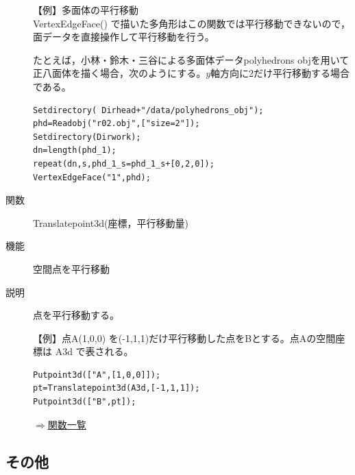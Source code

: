 \documentclass[papersize,a4paper,12pt,uplatex]{jsarticle}
\begin{document}
\begin{description}
\vspace{\baselineskip}
【例】多面体の平行移動\\
VertexEdgeFace() で描いた多角形はこの関数では平行移動できないので，面データを直接操作して平行移動を行う。

たとえば，小林・鈴木・三谷による多面体データpolyhedrons objを用いて正八面体を描く場合，次のようにする。$y$軸方向に2だけ平行移動する場合である。

\begin{verbatim}
Setdirectory( Dirhead+"/data/polyhedrons_obj");
phd=Readobj("r02.obj",["size=2"]);
Setdirectory(Dirwork);
dn=length(phd_1);
repeat(dn,s,phd_1_s=phd_1_s+[0,2,0]);
VertexEdgeFace("1",phd);
\end{verbatim}
\begin{center}  \end{center}

\hypertarget{translatepoint3d}{}
\item[関数]Translatepoint3d(座標，平行移動量)
\item[機能]空間点を平行移動
\item[説明]点を平行移動する。

\vspace{\baselineskip}
【例】点A(1,0,0) を(-1,1,1)だけ平行移動した点をBとする。点Aの空間座標は A3d で表される。 
\begin{verbatim}
Putpoint3d(["A",[1,0,0]]);
pt=Translatepoint3d(A3d,[-1,1,1]);
Putpoint3d(["B",pt]);
\end{verbatim}
\begin{flushright} \hyperlink{functionlist}{$\Rightarrow$関数一覧}\end{flushright}

 \end{description}
\newpage
\subsection{その他}
\end{document}
